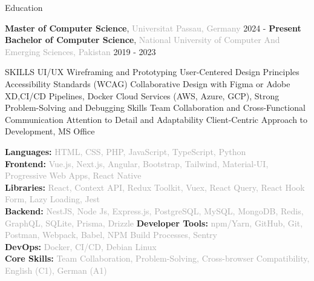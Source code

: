 \documentclass{resume} %
\begin{document}

\begin{rSection}{Education}

{\bf \small Master of Computer Science}, \textcolor{darkgray}{Universitat Passau, Germany }\hfill {2024 - \textbf{Present}} \\
{\bf \small  Bachelor of Computer Science}, \textcolor{darkgray}{National University of Computer And Emerging Sciences,  {Pakistan }}\hfill {{2019 - 2023}}

\end{rSection}

\begin{rSection}{SKILLS}
{\color{white}\tiny\hspace{0pt}
UI/UX Wireframing and Prototyping
User-Centered Design Principles
Accessibility Standards (WCAG)
Collaborative Design with Figma or Adobe XD,CI/CD Pipelines, Docker
Cloud Services (AWS, Azure, GCP), Strong Problem-Solving and Debugging Skills
Team Collaboration and Cross-Functional Communication
Attention to Detail and Adaptability
Client-Centric Approach to Development, MS Office
}

\vspace{-40pt} %
\textbf{Languages: }\textcolor{darkgray}{ HTML, CSS, PHP, JavaScript, TypeScript, Python}\\
\textbf{Frontend: }\textcolor{darkgray}{ Vue.js, Next.js, Angular, Bootstrap, Tailwind, Material-UI, Progressive Web Apps, React Native}\\
\textbf{Libraries:} \textcolor{darkgray}{ React, Context API, Redux Toolkit, Vuex, React Query, React Hook Form, Lazy Loading, Jest }\\
\textbf{Backend:} \textcolor{darkgray}{NestJS, Node Js, Express.js,  PostgreSQL, MySQL, MongoDB, Redis, GraphQL, SQLite, Prisma, Drizzle}
\textbf{Developer Tools:} \textcolor{darkgray}{npm/Yarn, GitHub, Git, Postman, Webpack, Babel, NPM Build Processes, Sentry }\\
\textbf{DevOps:} \textcolor{darkgray}{Docker, CI/CD, Debian Linux }\\
\textbf{Core Skills:} \textcolor{darkgray}{Team Collaboration, Problem-Solving, Cross-browser Compatibility, English (C1), German (A1)}
\end{rSection}
\end{document}

